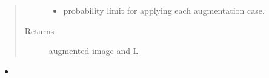 \documentclass[letterpaper,10pt,english]{sphinxmanual}
\begin{document}
\begin{fulllineitems}
\begin{quote}
\begin{description}
\begin{itemize}
\item {} 
 \textendash{} probability limit for applying each augmentation case.

\end{itemize}

\item[{Returns}] \leavevmode
augmented image and L

\end{description}\end{quote}



\begin{itemize}
\item {} 
{\hyperref[\detokenize{index:util.load_batch.img_aug}]{}}

\end{itemize}



\end{fulllineitems}

\end{document}
